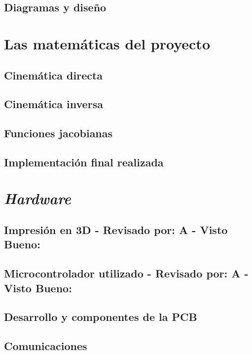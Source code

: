 \section{Diagramas y diseño}


\chapter{Las matemáticas del proyecto}

\section{Cinemática directa}

\section{Cinemática inversa}

\section{Funciones jacobianas}

\section{Implementación final realizada}


\chapter{\textit{Hardware}}

\section{Impresión en 3D - Revisado por: A - Visto Bueno: }

\section{Microcontrolador utilizado - Revisado por: A - Visto Bueno: }

\section{Desarrollo y componentes de la PCB}

\section{Comunicaciones}

